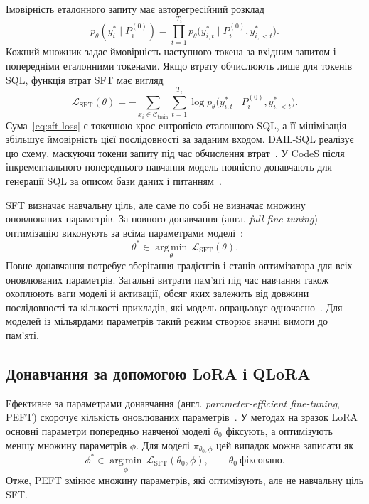 \documentclass[a4paper,14pt,oneside]{extreport}
\begin{document}
Імовірність еталонного запиту має авторегресійний розклад
\begin{equation}
\label{eq:sft-probability}
p_\theta(y_i^*\mid P_i^{(0)})
=
\prod_{t=1}^{T_i}
p_\theta\bigl(y_{i,t}^*\mid P_i^{(0)},y_{i,<t}^*\bigr).
\end{equation}
Кожний множник задає ймовірність наступного токена за вхідним запитом і попередніми еталонними токенами. Якщо втрату обчислюють лише для токенів SQL, функція втрат SFT має вигляд
\begin{equation}
\label{eq:sft-loss}
\mathcal L_{\mathrm{SFT}}(\theta)
=
-\sum_{x_i\in\mathcal C_{\mathrm{train}}}
\sum_{t=1}^{T_i}
\log p_\theta\bigl(y_{i,t}^*\mid P_i^{(0)},y_{i,<t}^*\bigr).
\end{equation}
Сума~\eqref{eq:sft-loss} є токенною крос-ентропією еталонного SQL, а її мінімізація збільшує ймовірність цієї послідовності за заданим входом. DAIL-SQL реалізує цю схему, маскуючи токени запиту під час обчислення втрат~\cite{gao2024benchmark}. У CodeS після інкрементального попереднього навчання модель повністю донавчають для генерації SQL за описом бази даних і питанням~\cite{li2024codes}.

SFT визначає навчальну ціль, але саме по собі не визначає множину оновлюваних параметрів. За повного донавчання (англ. \textit{full fine-tuning}) оптимізацію виконують за всіма параметрами моделі~\cite{hu2022lora}:
\begin{equation}
\label{eq:full-ft-objective}
\theta^*\in
\underset{\theta}{\operatorname{arg\,min}}\,
\mathcal L_{\mathrm{SFT}}(\theta).
\end{equation}
Повне донавчання потребує зберігання градієнтів і станів оптимізатора для всіх оновлюваних параметрів. Загальні витрати пам’яті під час навчання також охоплюють ваги моделі й активації, обсяг яких залежить від довжини послідовності та кількості прикладів, які модель опрацьовує одночасно~\cite{mao2025lorasurvey}. Для моделей із мільярдами параметрів такий режим створює значні вимоги до пам’яті.

\subsection{Донавчання за допомогою LoRA і QLoRA}

Ефективне за параметрами донавчання (англ. \textit{parameter-efficient fine-tuning}, PEFT) скорочує кількість оновлюваних параметрів~\cite{mao2025lorasurvey}. У методах на зразок LoRA основні параметри попередньо навченої моделі \(\theta_0\) фіксують, а оптимізують меншу множину параметрів \(\phi\). Для моделі \(\pi_{\theta_0,\phi}\) цей випадок можна записати як
\begin{equation}
\label{eq:peft-objective}
\phi^*\in
\underset{\phi}{\operatorname{arg\,min}}\,
\mathcal L_{\mathrm{SFT}}(\theta_0,\phi),
\qquad
\theta_0\ \text{фіксовано}.
\end{equation}
Отже, PEFT змінює множину параметрів, які оптимізують, але не навчальну ціль SFT.
\end{document}
